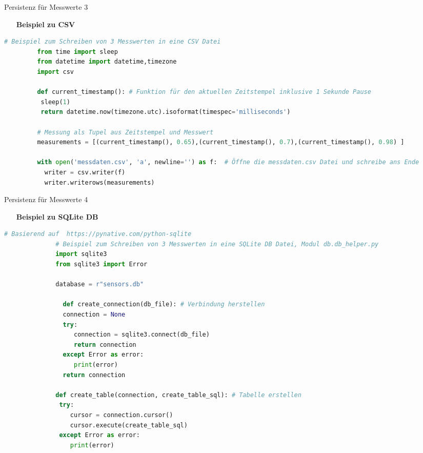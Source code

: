 \begin{frame}[fragile]{Persistenz für Messwerte 3}
    \begin{itemize}
        \setlength{\itemindent}{2.4in}
        \item [\textbf{Beispiel zu CSV}]
    \end{itemize}
       \begin{lstlisting}[language=Python, gobble=8]
         # Beispiel zum Schreiben von 3 Messwerten in eine CSV Datei
         from time import sleep
         from datetime import datetime,timezone
         import csv

         def current_timestamp(): # Funktion für den aktuellen Zeitstempel inklusive 1 Sekunde Pause
          sleep(1)
          return datetime.now(timezone.utc).isoformat(timespec='milliseconds')
    
         # Messung als Tupel aus Zeitstempel und Messwert
         measurements = [(current_timestamp(), 0.65),(current_timestamp(), 0.7),(current_timestamp(), 0.98) ]

         with open('messdaten.csv', 'a', newline='') as f:  # Öffne die messdaten.csv Datei und schreibe ans Ende
           writer = csv.writer(f)
           writer.writerows(measurements)
        \end{lstlisting}

\end{frame}




\begin{frame}[fragile]{Persistenz für Messwerte 4}
    \begin{itemize}
        \setlength{\itemindent}{2.4in}
        \item [\textbf{Beispiel zu SQLite DB}]
    \end{itemize}
       \begin{lstlisting}[language=Python, gobble=8]
              # Basierend auf  https://pynative.com/python-sqlite
              # Beispiel zum Schreiben von 3 Messwerten in eine SQLite DB Datei, Modul db.db_helper.py
              import sqlite3
              from sqlite3 import Error
 
              database = r"sensors.db"
            
	            def create_connection(db_file): # Verbindung herstellen
                connection = None
                try:
                   connection = sqlite3.connect(db_file)
                   return connection
                except Error as error:
                   print(error)
                return connection
                
              def create_table(connection, create_table_sql): # Tabelle erstellen
               try:
                  cursor = connection.cursor()
                  cursor.execute(create_table_sql)
               except Error as error:
                  print(error)
 

        \end{lstlisting}

\end{frame}


